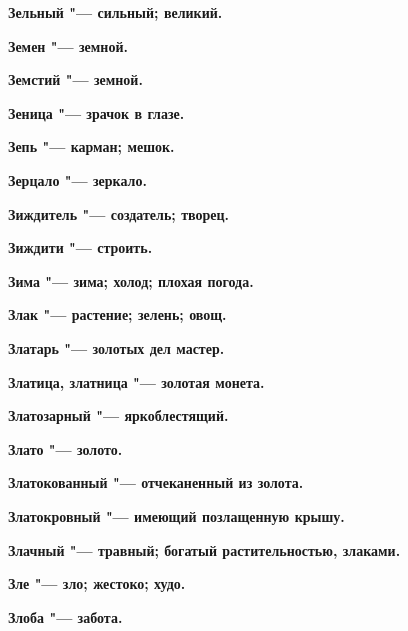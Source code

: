 \bfseries Зельный \normalfont{} "--- сильный; великий. 




\bfseries Земен \normalfont{} "--- земной. 




\bfseries Земстий \normalfont{} "--- земной. 




\bfseries Зеница \normalfont{} "--- зрачок в глазе. 




\bfseries Зепь \normalfont{} "--- карман; мешок. 




\bfseries Зерцало \normalfont{} "--- зеркало. 




\bfseries Зиждитель \normalfont{} "--- создатель; творец. 




\bfseries Зиждити \normalfont{} "--- строить. 




\bfseries Зима \normalfont{} "--- зима; холод; плохая погода. 




\bfseries Злак \normalfont{} "--- растение; зелень; овощ. 




\bfseries Златарь \normalfont{} "--- золотых дел мастер. 




\bfseries Златица, златница \normalfont{} "--- золотая монета. 




\bfseries Златозарный \normalfont{} "--- яркоблестящий. 




\bfseries Злато \normalfont{} "--- золото. 




\bfseries Златокованный \normalfont{} "--- отчеканенный из золота. 




\bfseries Златокровный \normalfont{} "--- имеющий позлащенную крышу. 




\bfseries Злачный \normalfont{} "--- травный; богатый растительностью, злаками. 




\bfseries Зле \normalfont{} "--- зло; жестоко; худо. 




\bfseries Злоба \normalfont{} "--- забота. 




